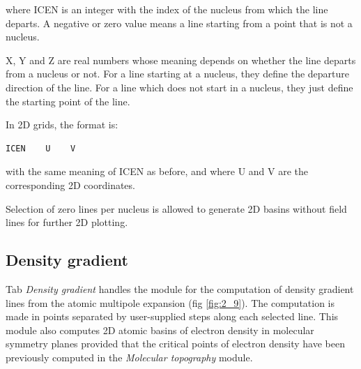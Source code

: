 \documentclass[10pt]{article}
\begin{document}
where ICEN is an integer with the index of the nucleus from which the line
departs. A negative or zero value means a line starting from a point that
is not a nucleus.

X, Y and Z are real numbers whose meaning depends on whether
the line departs from a nucleus or not. For a line starting at a nucleus, they
define the departure direction of the line. For a line which does not start in a
nucleus, they just define the starting point of the line.

In 2D grids, the format is:

\begin{verbatim}
ICEN    U    V   
\end{verbatim}

with the same meaning of ICEN as before, and
where U and V are the corresponding 2D coordinates.

Selection of zero lines per nucleus is allowed to generate 2D basins without field lines for further 2D plotting.


\subsection{Density gradient \label{sec:2.9}}

Tab {\it Density gradient} handles the module for the computation of
density gradient lines from the atomic multipole expansion (fig \ref{fig:2_9}).
The computation is made in points separated by user-supplied steps along each
selected line. 
This module also computes 2D atomic basins of electron density in molecular symmetry planes provided that 
the critical points of electron density have been previously computed in the {\it Molecular topography} module.
 
\end{document}
